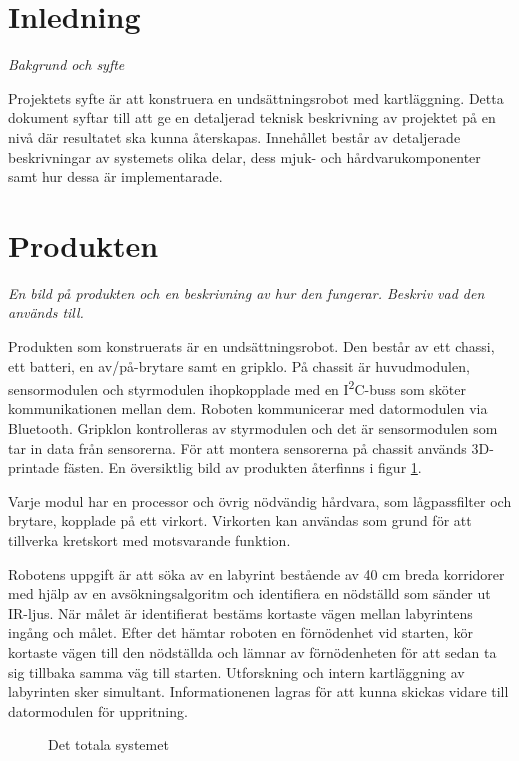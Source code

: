 \documentclass[11pt]{article}
\begin{document}
\begin{flushleft}
\section{Inledning}
\textit{Bakgrund och syfte}

Projektets syfte är att konstruera en undsättningsrobot med kartläggning. Detta dokument syftar till att ge en detaljerad teknisk beskrivning av projektet på en nivå där resultatet ska kunna återskapas. Innehållet består av detaljerade beskrivningar av systemets olika delar, dess mjuk- och hårdvarukomponenter samt hur dessa är implementarade.

\section{Produkten}
\textit{En bild på produkten och en beskrivning av hur den fungerar. Beskriv vad den används till.}

Produkten som konstruerats är en undsättningsrobot. Den består av ett chassi, ett batteri, en av/på-brytare samt en gripklo. På chassit är huvudmodulen, sensormodulen och styrmodulen ihopkopplade med en I\textsuperscript{2}C-buss som sköter kommunikationen mellan dem. Roboten kommunicerar med datormodulen via Bluetooth\textsuperscript{\circledR}. Gripklon kontrolleras av styrmodulen och  det är sensormodulen som tar in data från sensorerna. För att montera sensorerna på chassit används 3D-printade fästen. En översiktlig bild av produkten återfinns i figur \ref{overview}.

Varje modul har en processor och övrig nödvändig hårdvara, som lågpassfilter och brytare, kopplade på ett virkort. Virkorten kan användas som grund för att tillverka kretskort med motsvarande funktion. 

Robotens uppgift är att söka av en labyrint bestående av 40 cm breda korridorer med hjälp av en avsökningsalgoritm och identifiera en nödställd som sänder ut IR-ljus. När målet är identifierat bestäms kortaste vägen mellan labyrintens ingång och målet. Efter det hämtar roboten en förnödenhet vid starten, kör kortaste vägen till den nödställda och lämnar av förnödenheten för att sedan ta sig tillbaka samma väg till starten. Utforskning och intern kartläggning av labyrinten sker simultant. Informationenen lagras för att kunna skickas vidare till datormodulen för uppritning. 


\begin{figure}[!htbp]
\centering
\noindent\resizebox{\linewidth}{!}{
	}
	\caption{Det totala systemet \label{overview}}	
\end{figure}


\end{flushleft}
\end{document}
